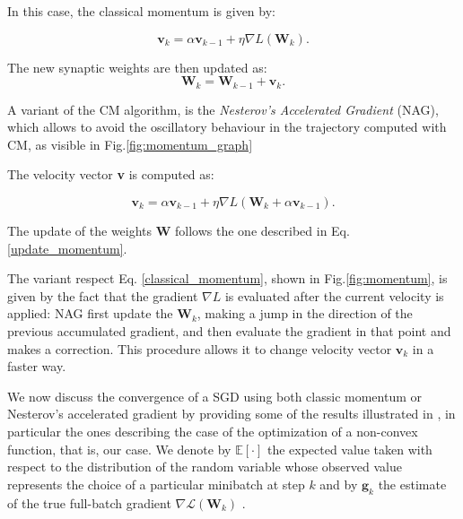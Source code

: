 			In this case, the classical momentum is given by:

			\begin{equation}
				\label{classical_momentum}
				\textbf{v}_k = \alpha\textbf{v}_{k-1} + \eta\nabla\textit{L}(\textbf{W}_k).
			\end{equation}

			The new synaptic weights are then updated as:
			\begin{equation}
				\label{update_momentum}
				\textbf{W}_k = \textbf{W}_{k-1}  + \textbf{v}_k.
			\end{equation}

			A variant of the CM algorithm, is the \textit{Nesterov's Accelerated Gradient} (NAG), which allows to avoid the oscillatory behaviour in the trajectory computed with CM, as visible in Fig.\ref{fig:momentum_graph}%

			The velocity vector \textbf{v} is computed as:

			\begin{equation}
				\label{nesterov_momentum}
				\textbf{v}_k = \alpha\textbf{v}_{k-1} + \eta\nabla\textit{L}(\textbf{W}_k + \alpha\textbf{v}_{k-1}).
			\end{equation}

			The update of the weights \textbf{W} follows the one described in Eq. \ref{update_momentum}.

			The variant respect Eq. \ref{classical_momentum}, shown in Fig.\ref{fig:momentum}, is given by the fact that the gradient $\nabla\textit{L}$ is evaluated after the current velocity is applied: NAG first update the $\textbf{W}_k$, making a jump in the direction of the previous accumulated gradient, and then evaluate the gradient in that point and makes a correction. This procedure allows it to change velocity vector $\textbf{v}_{k}$ in a faster way.

			We now discuss the convergence of a SGD using both classic momentum or Nesterov's accelerated
			gradient by providing some of the results illustrated in \cite{unified_convergence}, in particular
			the ones describing the case of the optimization of a non-convex function, that is, our case.
			We denote by $\mathbb{E}[\cdot]$ the expected value taken with respect to the distribution of the
			random variable whose observed value represents the choice of a particular minibatch at step $k$ and by
			$\mathbf{g}_{k}$ the estimate of the true full-batch gradient $\nabla \mathcal{L}(\textbf{W}_{k})$ .

